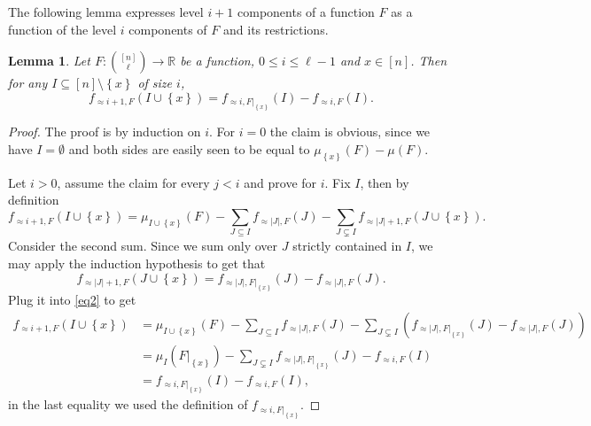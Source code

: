 \documentclass[11pt]{article}
\newtheorem{lemma}[theorem]{Lemma}
\newcommand\card[1]{\left| {#1} \right|}
\newcommand\set[1]{{\left\{ #1 \right\}}}
\renewcommand\leq{\leqslant}
\newcommand\approxlvlfn[2]{{#1}_{\approx{#2}}}
\begin{document}
The following lemma expresses level $i+1$ components of a function $F$ as a function of the level $i$ components of
$F$ and its restrictions.
\begin{lemma}\label{lemma:restrict}
Let $F\colon {[n]\choose \ell}\to\mathbb{R}$ be a function, $0\leq i\leq \ell-1$
and $x\in [n]$.
Then for any $I\subseteq [n]\setminus\set{x}$ of size $i$,
\[
\approxlvlfn{f}{i+1, F}(I\cup\set{x})
= \approxlvlfn{f}{i,F|_{\set{x}}}(I) - \approxlvlfn{f}{i,F}(I).
\]
\end{lemma}
\begin{proof}
The proof is by induction on $i$. For $i=0$ the claim is obvious, since we have $I=\emptyset$ and
both sides are easily seen to be equal to $\mu_{\set{x}}(F)-\mu(F)$.

Let $i>0$, assume the claim for every $j<i$ and prove for $i$. Fix $I$, then by definition
\begin{equation}\label{eq2}
\approxlvlfn{f}{i+1, F}(I\cup\set{x})
=\mu_{I\cup\set{x}}(F)
-\sum\limits_{J\subseteq I}{\approxlvlfn{f}{\card{J}, F}(J)}
-\sum\limits_{J\subsetneq I}{\approxlvlfn{f}{\card{J}+1, F}(J\cup\set{x})}.
\end{equation}
Consider the second sum. Since we sum only over $J$ strictly contained in $I$, we may
apply the induction hypothesis to get that
\[
\approxlvlfn{f}{\card{J}+1, F}(J\cup\set{x})
=\approxlvlfn{f}{\card{J}, F|_{\set{x}}}(J)
-\approxlvlfn{f}{\card{J}, F}(J).
\]
Plug it into \eqref{eq2} to get
\begin{align*}
\approxlvlfn{f}{i+1, F}(I\cup\set{x})
&=\mu_{I\cup\set{x}}(F)
-\sum\limits_{J\subseteq I}{\approxlvlfn{f}{\card{J}, F}(J)}
-\sum\limits_{J\subsetneq I}
{(\approxlvlfn{f}{\card{J}, F|_{\set{x}}}(J) - \approxlvlfn{f}{\card{J}, F}(J))}\\
&= \mu_{I}(F|_{\set{x}}) -
\sum\limits_{J\subsetneq I}{\approxlvlfn{f}{\card{J}, F|_{\set{x}}}(J)}
-\approxlvlfn{f}{i, F}(I)\\
&=\approxlvlfn{f}{i, F|_{\set{x}}}(I)-\approxlvlfn{f}{i, F}(I),
\end{align*}
in the last equality we used the definition of $\approxlvlfn{f}{i, F|_{\set{x}}}$.
\end{proof}
\end{document}
